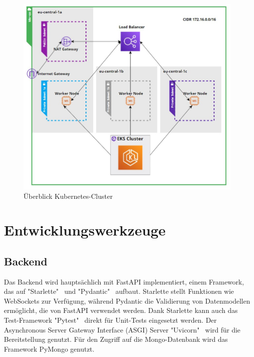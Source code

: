 \documentclass[a4paper, 10pt, conference]{IEEEtran}
\begin{document}
\begin{figure}[thp]
    \centering
    \includegraphics[width=\linewidth]{k8s}
    \caption{Überblick Kubernetes-Cluster}
    \label{fig:infra}
\end{figure}

\section{Entwicklungswerkzeuge}\label{sec:entwicklungswerkzeuge}



\subsection{Backend}\label{subsec:backend-dev-tools}
Das Backend wird hauptsächlich mit FastAPI implementiert, einem Framework, das auf "Starlette"~\cite{starlette} und "Pydantic"~\cite{pydantic} aufbaut. Starlette stellt Funktionen wie WebSockets zur Verfügung, während Pydantic die Validierung von Datenmodellen ermöglicht, die von FastAPI verwendet werden. Dank Starlette kann auch das Test-Framework "Pytest"~\cite{pytest} direkt für Unit-Tests eingesetzt werden. Der Asynchronous Server Gateway Interface (ASGI) Server "Uvicorn"~\cite{unvicorn} wird für die Bereitstellung genutzt.
Für den Zugriff auf die Mongo-Datenbank wird das Framework PyMongo genutzt. 
\end{document}
